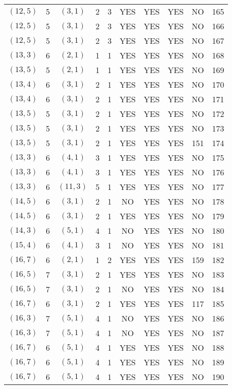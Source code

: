 \begin{longtable}{|c|c|c|c|c|c|c|c|c|c|}
$(12, 5)$ & 5 & $(3, 1)$ & 2 & 3 & YES & YES & YES & NO & 165\\
$(12, 5)$ & 5 & $(3, 1)$ & 2 & 3 & YES & YES & YES & NO & 166\\
$(12, 5)$ & 5 & $(3, 1)$ & 2 & 3 & YES & YES & YES & NO & 167\\
$(13, 3)$ & 6 & $(2, 1)$ & 1 & 1 & YES & YES & YES & NO & 168\\
$(13, 5)$ & 5 & $(2, 1)$ & 1 & 1 & YES & YES & YES & NO & 169\\
$(13, 4)$ & 6 & $(3, 1)$ & 2 & 1 & YES & YES & YES & NO & 170\\
$(13, 4)$ & 6 & $(3, 1)$ & 2 & 1 & YES & YES & YES & NO & 171\\
$(13, 5)$ & 5 & $(3, 1)$ & 2 & 1 & YES & YES & YES & NO & 172\\
$(13, 5)$ & 5 & $(3, 1)$ & 2 & 1 & YES & YES & YES & NO & 173\\
$(13, 5)$ & 5 & $(3, 1)$ & 2 & 1 & YES & YES & YES & 151 & 174\\
$(13, 3)$ & 6 & $(4, 1)$ & 3 & 1 & YES & YES & YES & NO & 175\\
$(13, 3)$ & 6 & $(4, 1)$ & 3 & 1 & YES & YES & YES & NO & 176\\
$(13, 3)$ & 6 & $(11, 3)$ & 5 & 1 & YES & YES & YES & NO & 177\\
$(14, 5)$ & 6 & $(3, 1)$ & 2 & 1 & NO & YES & YES & NO & 178\\
$(14, 5)$ & 6 & $(3, 1)$ & 2 & 1 & YES & YES & YES & NO & 179\\
$(14, 3)$ & 6 & $(5, 1)$ & 4 & 1 & NO & YES & YES & NO & 180\\
$(15, 4)$ & 6 & $(4, 1)$ & 3 & 1 & NO & YES & YES & NO & 181\\
$(16, 7)$ & 6 & $(2, 1)$ & 1 & 2 & YES & YES & YES & 159 & 182\\
$(16, 5)$ & 7 & $(3, 1)$ & 2 & 1 & YES & YES & YES & NO & 183\\
$(16, 5)$ & 7 & $(3, 1)$ & 2 & 1 & NO & YES & YES & NO & 184\\
$(16, 7)$ & 6 & $(3, 1)$ & 2 & 1 & YES & YES & YES & 117 & 185\\
$(16, 3)$ & 7 & $(5, 1)$ & 4 & 1 & NO & YES & YES & NO & 186\\
$(16, 3)$ & 7 & $(5, 1)$ & 4 & 1 & NO & YES & YES & NO & 187\\
$(16, 7)$ & 6 & $(5, 1)$ & 4 & 1 & YES & YES & YES & NO & 188\\
$(16, 7)$ & 6 & $(5, 1)$ & 4 & 1 & YES & YES & YES & NO & 189\\
$(16, 7)$ & 6 & $(5, 1)$ & 4 & 1 & YES & YES & YES & NO & 190\\

\end{longtable}
